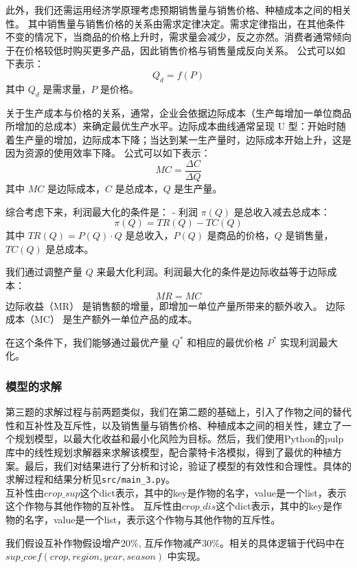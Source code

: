 \documentclass[withoutpreface]{cumcmthesis}
\begin{document}
此外，我们还需运用经济学原理考虑预期销售量与销售价格、种植成本之间的相关性。
其中销售量与销售价格的关系由需求定律决定。需求定律指出，在其他条件不变的情况下，当商品的价格上升时，需求量会减少，反之亦然。消费者通常倾向于在价格较低时购买更多产品，因此销售价格与销售量成反向关系。
公式可以如下表示：  
  \[ Q_d = f(P) \]
  其中 \( Q_d \) 是需求量，\( P \) 是价格。
  
关于生产成本与价格的关系，通常，企业会依据边际成本（生产每增加一单位商品所增加的总成本）来确定最优生产水平。边际成本曲线通常呈现 U 型：开始时随着生产量的增加，边际成本下降；当达到某一生产量时，边际成本开始上升，这是因为资源的使用效率下降。
公式可以如下表示：  
\[ MC = \frac{\Delta C}{\Delta Q} \]
其中 \( MC \) 是边际成本，\( C \) 是总成本，\( Q \) 是生产量。

综合考虑下来，利润最大化的条件是：
- 利润 \( \pi(Q) \) 是总收入减去总成本：
  \[
  \pi(Q) = TR(Q) - TC(Q)
  \]
  其中 \( TR(Q) = P(Q) \cdot Q \) 是总收入，\( P(Q) \) 是商品的价格，\( Q \) 是销售量，\( TC(Q) \) 是总成本。

我们通过调整产量 \( Q \) 来最大化利润。利润最大化的条件是边际收益等于边际成本：
  \[
  MR = MC
  \]
  边际收益（MR） 是销售额的增量，即增加一单位产量所带来的额外收入。
  边际成本（MC） 是生产额外一单位产品的成本。

在这个条件下，我们能够通过最优产量 \( Q^* \) 和相应的最优价格 \( P^* \) 实现利润最大化。


\subsubsection{模型的求解}
第三题的求解过程与前两题类似，我们在第二题的基础上，引入了作物之间的替代性和互补性及互斥性，以及销售量与销售价格、种植成本之间的相关性，建立了一个规划模型，以最大化收益和最小化风险为目标。然后，我们使用Python的pulp库中的线性规划求解器来求解该模型，配合蒙特卡洛模拟，得到了最优的种植方案。最后，我们对结果进行了分析和讨论，验证了模型的有效性和合理性。具体的求解过程和结果分析见\verb|src/main_3.py|。\\

互补性由$ crop\_sup $这个dict表示，其中的key是作物的名字，value是一个list，表示这个作物与其他作物的互补性。
互斥性由$ crop\_dis $这个dict表示，其中的key是作物的名字，value是一个list，表示这个作物与其他作物的互斥性。
  
我们假设互补作物假设增产20\%, 互斥作物减产30\%。相关的具体逻辑于代码中在$ sup\_coef(crop, region, year, season) $ 中实现。\\
\end{document}
